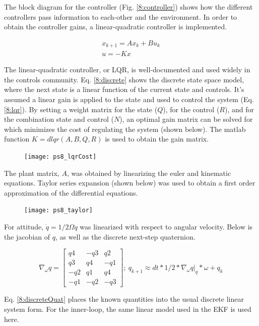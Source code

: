 \documentclass[12pt, letterpaper]{article}
\begin{document}
The block diagram for the controller (Fig. \ref{8:controller}) shows how the different controllers pass information to each-other and the environment. In order to obtain the controller gains, a linear-quadratic controller is implemented.

\begin{gather}
x_{k+1}=Ax_k+Bu_k
\label{8:discrete} \\ 
u=-Kx
\label{8:lqr}
\end{gather}

The linear-quadratic controller, or LQR, is well-documented and used widely in the controls community. Eq. \ref{8:discrete} shows the discrete state space model, where the next state is a linear function of the current state and controls. It's assumed a linear gain is applied to the state and used to control the system (Eq. \ref{8:lqr}). By setting a weight matrix for the state ($Q$), for the control ($R$), and for the combination state and control ($N$), an optimal gain matrix can be solved for which minimizes the cost of regulating the system (shown below). The matlab function $K=dlqr(A,B,Q,R)$ is used to obtain the gain matrix.

\begin{figure}[H]
	\centering
	\texttt{[image: ps8\_lqrCost]}
	\label{8:lqrCost}
\end{figure}


The plant matrix, $A$, was obtained by linearizing the euler and kinematic equations. Taylor series expansion (shown below) was used to obtain a first order approximation of the differential equations.

\begin{figure}[H]
	\centering
	\texttt{[image: ps8\_taylor]}
	\label{8:taylor}
\end{figure}

For attitude, $\dot{q} = 1/2\Omega q$ was linearized with respect to angular velocity. Below is the jacobian of $q$, as well as the discrete next-step quaternion.

\[
\nabla_\omega q =
\begin{bmatrix}
q4 &-q3 &q2 \\
q3 &q4 &-q1 \\
-q2 &q1 &q4 \\
-q1 &-q2 &-q3
\end{bmatrix}
;\ q_{k+1} \approx dt*1/2*\nabla_\omega q|_q*\omega + q_k
\]

Eq. \ref{8:discreteQuat} places the known quantities into the usual discrete linear system form. For the inner-loop, the same linear model used in the EKF is used here.
\end{document}
